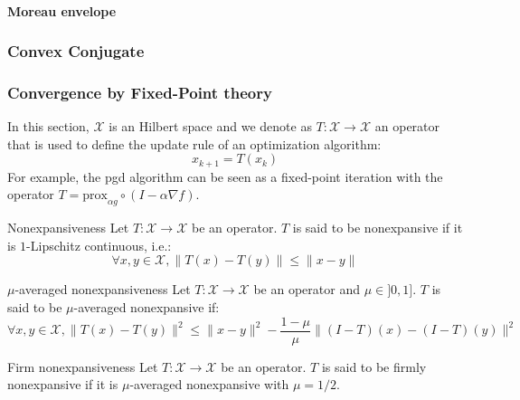 \paragraph{Moreau envelope}

\subsubsection{Convex Conjugate}



\subsubsection{Convergence by Fixed-Point theory}

In this section, $\mathcal{X}$ is an Hilbert space and we denote as $T: \mathcal{X} \to \mathcal{X}$ an operator that is used to define the update rule of an optimization algorithm:
\begin{equation}
    x_{k+1} = T(x_k)
\end{equation}
For example, the \acrshort{pgd} algorithm can be seen as a fixed-point iteration with the operator $T = \text{prox}_{\alpha g} \circ (I - \alpha \nabla f)$.

\begin{definition}{Nonexpansiveness}
    Let $T: \mathcal{X} \to \mathcal{X}$ be an operator. $T$ is said to be nonexpansive if it is $1$-Lipschitz continuous, i.e.:
    \begin{equation}
        \forall x, y \in \mathcal{X}, \|T(x) - T(y)\| \leq \|x - y\|
    \end{equation}
\end{definition}

\begin{definition}{$\mu$-averaged nonexpansiveness}
    Let $T: \mathcal{X} \to \mathcal{X}$ be an operator and $\mu \in ]0, 1]$. $T$ is said to be $\mu$-averaged nonexpansive if:
    \begin{equation}
        \forall x, y \in \mathcal{X}, \|T(x) - T(y)\|^2 \leq \|x - y\|^2 - \frac{1 - \mu}{\mu} \|(I - T)(x) - (I - T)(y)\|^2
    \end{equation}
\end{definition}

\begin{definition}{Firm nonexpansiveness}
    Let $T: \mathcal{X} \to \mathcal{X}$ be an operator. $T$ is said to be firmly nonexpansive if it is $\mu$-averaged nonexpansive with $\mu = 1/2$.
\end{definition}


